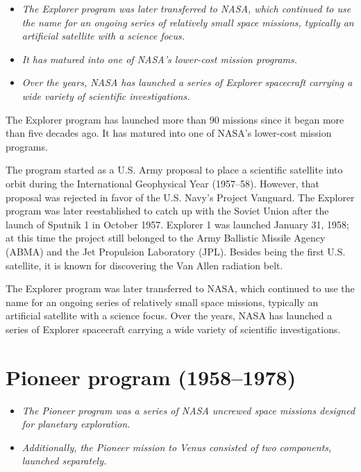 \begin{itemize}
\item
  \emph{The Explorer program was later transferred to NASA, which
  continued to use the name for an ongoing series of relatively small
  space missions, typically an artificial satellite with a science
  focus.}
\item
  \emph{It has matured into one of NASA's lower-cost mission programs.}
\item
  \emph{Over the years, NASA has launched a series of Explorer
  spacecraft carrying a wide variety of scientific investigations.}
\end{itemize}

The Explorer program has launched more than 90 missions since it began
more than five decades ago. It has matured into one of NASA's lower-cost
mission programs.

The program started as a U.S. Army proposal to place a scientific
satellite into orbit during the International Geophysical Year
(1957--58). However, that proposal was rejected in favor of the U.S.
Navy's Project Vanguard. The Explorer program was later reestablished to
catch up with the Soviet Union after the launch of Sputnik 1 in October
1957. Explorer 1 was launched January 31, 1958; at this time the project
still belonged to the Army Ballistic Missile Agency (ABMA) and the Jet
Propulsion Laboratory (JPL). Besides being the first U.S. satellite, it
is known for discovering the Van Allen radiation belt.

The Explorer program was later transferred to NASA, which continued to
use the name for an ongoing series of relatively small space missions,
typically an artificial satellite with a science focus. Over the years,
NASA has launched a series of Explorer spacecraft carrying a wide
variety of scientific investigations.

\section{Pioneer program (1958--1978)}\label{pioneer-program-19581978}

\begin{itemize}
\item
  \emph{The Pioneer program was a series of NASA uncrewed space missions
  designed for planetary exploration.}
\item
  \emph{Additionally, the Pioneer mission to Venus consisted of two
  components, launched separately.}
\end{itemize}

